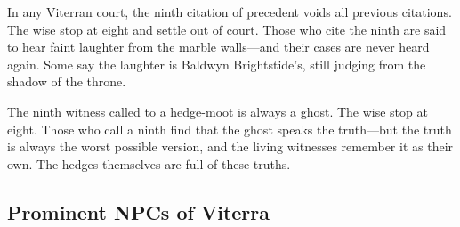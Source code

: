 \begin{tcolorbox}[colback=black!3,colframe=red!60!black,title={The Ninth Taboo Manifestation},breakable]
In any Viterran court, the ninth citation of precedent voids all previous citations. The wise stop at eight and settle out of court. Those who cite the ninth are said to hear faint laughter from the marble walls---and their cases are never heard again. Some say the laughter is Baldwyn Brightstide's, still judging from the shadow of the throne.

The ninth witness called to a hedge-moot is always a ghost. The wise stop at eight. Those who call a ninth find that the ghost speaks the truth---but the truth is always the worst possible version, and the living witnesses remember it as their own. The hedges themselves are full of these truths.
\end{tcolorbox}

\subsection{Prominent NPCs of Viterra}
\label{sec:viterra-npcs}

